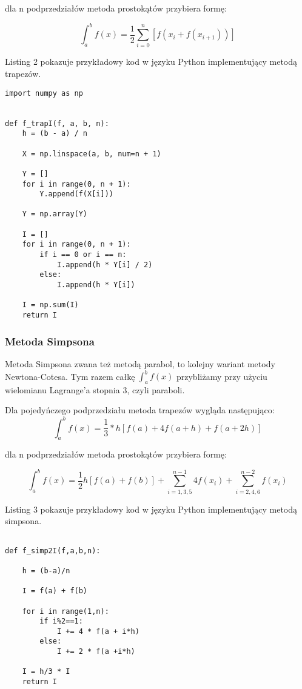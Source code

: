 \documentclass[12pt,twoside]{article}
\begin{document}
dla n podprzedziałów metoda prostokątów przybiera formę:

\begin{equation}
\int_a^b f(x) =  \frac{1}{2}\sum_{i=0}^n[f(x_i + f(x_{i+1}))] 
\label{Eq:rownanie}
\end{equation}

Listing 2 pokazuje przykładowy kod w języku Python implementujący metodą trapezów.

\begin{lstlisting}[caption={Kod w języku python implementujący metodę trapezów}]
import numpy as np


def f_trapI(f, a, b, n):
    h = (b - a) / n

    X = np.linspace(a, b, num=n + 1)

    Y = []
    for i in range(0, n + 1):
        Y.append(f(X[i]))

    Y = np.array(Y)

    I = []
    for i in range(0, n + 1):
        if i == 0 or i == n:
            I.append(h * Y[i] / 2)
        else:
            I.append(h * Y[i])

    I = np.sum(I)
    return I

\end{lstlisting}
\label{Listing 2}

\subsubsection{Metoda Simpsona}
Metoda Simpsona zwana też metodą parabol, to kolejny wariant metody Newtona-Cotesa. Tym razem całkę $\int_a^b f(x)$ przybliżamy przy użyciu wielomianu Lagrange'a stopnia 3, czyli paraboli.

Dla pojedyńczego podprzedziału metoda trapezów wygląda następująco:
\begin{equation}
\int_a^b f(x) =  \frac{1}{3}*h[f(a) + 4f(a+h) + f(a+2h)]
\label{Eq:rownanie}
\end{equation}

dla n podprzedziałów metoda prostokątów przybiera formę:

\begin{equation}
\int_a^b f(x) =  \frac{1}{2}h {[f(a) + f(b)] + \sum_{i=1,3,5}^{n-1}4f(x_i) + \sum_{i=2,4,6}^{n-2} f(x_i) }
\label{Eq:rownanie}
\end{equation}

Listing 3 pokazuje przykładowy kod w języku Python implementujący metodą simpsona.

\begin{lstlisting}[caption={Kod w języku python implementujący metodę simpsona}]

def f_simp2I(f,a,b,n):

    h = (b-a)/n

    I = f(a) + f(b)

    for i in range(1,n):
        if i%2==1:
            I += 4 * f(a + i*h)
        else:
            I += 2 * f(a +i*h)

    I = h/3 * I
    return I

\end{lstlisting}
\label{Listing 2}
\end{document}
